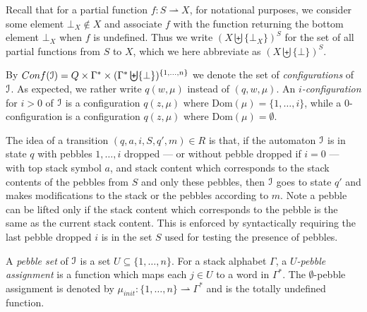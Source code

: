 \documentclass[a4paper,UKenglish,cleveref, autoref, thm-restate]{lipics-v2021}
\newcommand{\Conf}{\mathsf{Conf}}
\begin{document}
Recall that for a partial function $ f : S \rightharpoonup X $, for notational purposes, we consider some element $\bot_X \not\in X$ and 
 associate $f$ with the function returning the 
bottom element $\bot_X$ when $f$ is undefined. Thus we write $(X \biguplus \{ \bot_X \})^S$ for the set of all partial functions from $S$ to $X$, which we here abbreviate as $(X \biguplus \{ \bot \})^S$. 



 
 


By $\Conf(\ppda)=Q\times \Gamma^* \times (\Gamma^* \biguplus \{ \bot \})^{\{1, \ldots, n\}}$ we denote the set of
{\em configurations} of $\mathcal{I}$. As expected, we rather write $q(w, \mu)$ instead of $(q, w, \mu)$.
An {\em$i$-configuration} for $i > 0$ of $\mathcal{I}$ is a configuration $q(z,\mu)$ where
$\text{Dom}(\mu) = \{1, \ldots, i\}$, while a $0$-configuration is a configuration 
 $q(z,\mu)$ where $\text{Dom}(\mu)=\emptyset$.



The idea of a transition $(q, a, i, S, q', m) \in R$
is that, if the automaton $\mathcal{I}$ is in state $q$ with pebbles $1,\ldots, i$ dropped \---- or without pebble dropped if $i = 0$ \---- with top stack symbol $a$, and stack content which corresponds to the stack contents of the pebbles from $S$ and only these pebbles, then
$\mathcal{I}$ goes to state 
$q'$ and makes modifications to the stack or the pebbles according to
$m$. 
Note a pebble 
can be lifted only if the stack content which corresponds to the pebble
is the same as the current stack content. 
This is enforced by syntactically requiring
the last pebble dropped $i$ is in the set $S$ used for testing the presence of  pebbles.




A {\em pebble set} of $\mathcal{I}$ is a set $U \subseteq \{ 1, \ldots, n\}$. For a stack alphabet $\Gamma$, a 
{\em $U \!$-pebble assignment} is a function which maps each $j \in U$ to a word in $ \Gamma^*$.
The $\emptyset$-pebble assignment is denoted by $\mu_{init} :  \{ 1, \ldots, n\} \rightharpoonup  \Gamma^* $ and is the 
totally undefined function.
\end{document}

